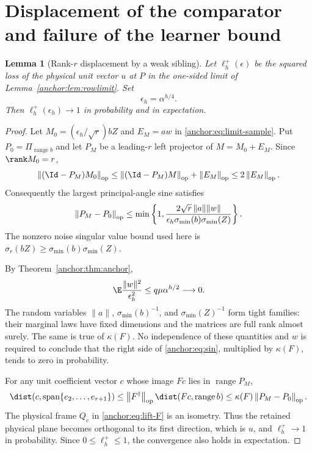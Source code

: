 \documentclass[11pt,oneside,openany,a4paper]{book}
\numberwithin{equation}{chapter}
\newtheorem{lemma}[theorem]{Lemma}
\theoremstyle{definition}
\theoremstyle{remark}
\newcommand{\op}[1]{\left\lVert#1\right\rVert_{\rm op}}
\DeclareMathOperator{\ran}{range}\DeclareMathOperator{\OPT}{OPT}
\begin{document}
\section{Displacement of the comparator and failure of the learner bound}
\begin{lemma}[Rank-$r$ displacement by a weak sibling]\label{anchor:lem:displacement}
Let $\ell_h^+(\epsilon)$ be the squared loss of the physical unit vector $u$ at $P$ in the one-sided limit of Lemma~\ref{anchor:lem:rowlimit}. Set
\begin{equation}\label{anchor:eq:eps}
 \epsilon_h=\alpha^{h/4}.
\end{equation}
Then $\ell_h^+(\epsilon_h)\to1$ in probability and in expectation.
\end{lemma}
\begin{proof}
Let $M_0=(\epsilon_h/\sqrt r)bZ$ and $E_M=aw$ in \eqref{anchor:eq:limit-sample}. Put $P_0=\Pi_{\ran b}$ and let $P_M$ be a leading-$r$ left projector of $M=M_0+E_M$. Since $\rank M_0=r$,
\[
 \op{(\Id-P_M)M_0}\le\op{(\Id-P_M)M}+\op{E_M}
 \le2\op{E_M}.
\]
Consequently the largest principal-angle sine satisfies
\begin{equation}\label{anchor:eq:sin}
 \op{P_M-P_0}\le
 \min\left\{1,\frac{2\sqrt r\,\|a\|\|w\|}
 {\epsilon_h\sigma_{\min}(b)\sigma_{\min}(Z)}\right\}.
\end{equation}
The nonzero noise singular value bound used here is
$\sigma_r(bZ)\ge\sigma_{\min}(b)\sigma_{\min}(Z)$.

By Theorem~\ref{anchor:thm:anchor},
\[
 \E\frac{\|w\|^2}{\epsilon_h^2}\le q\mu\alpha^{h/2}\longrightarrow0.
\]
The random variables $\|a\|$, $\sigma_{\min}(b)^{-1}$, and $\sigma_{\min}(Z)^{-1}$ form tight families: their marginal laws have fixed dimensions and the matrices are full rank almost surely. The same is true of $\kappa(F)$. No independence of these quantities and $w$ is required to conclude that the right side of \eqref{anchor:eq:sin}, multiplied by $\kappa(F)$, tends to zero in probability.

For any unit coefficient vector $c$ whose image $Fc$ lies in $\ran P_M$,
\[
 \dist(c,\operatorname{span}\{e_2,\ldots,e_{r+1}\})
 \le\op{F^\dagger}\dist(Fc,\ran b)
 \le\kappa(F)\op{P_M-P_0}.
\]
The physical frame $Q_c$ in \eqref{anchor:eq:lift-F} is an isometry. Thus the retained physical plane becomes orthogonal to its first direction, which is $u$, and $\ell_h^+\to1$ in probability. Since $0\le\ell_h^+\le1$, the convergence also holds in expectation.
\end{proof}
\end{document}
